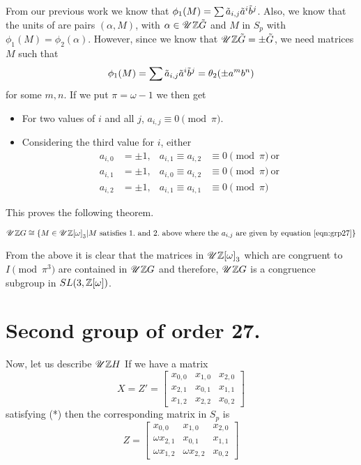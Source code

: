 \documentclass[11pt]{report}
\begin{document}
From our previous work we know that 
$\phi_1(M) = \sum \tilde{a}_{i,j} \tilde{a}^i \tilde{b}^j$.
Also, we know that the units
of \intG{} are pairs $(\alpha,M)$, with 
$\alpha \in \mathscr{U}{ \mathbb{Z}\tilde{G}}$ and $M$ in $S_p$ 
with $\phi_1(M) = \phi_2(\alpha)$.
However, since we know that $\mathscr{U}{ \mathbb{Z}\tilde{G}}  = \pm \tilde{G}$, 
we need matrices $M$ such that
\begin{equation*}
\phi_1(M) = \sum \tilde{a}_{i,j} \tilde{a}^i \tilde{b}^j = \theta_2(\pm a^m b^n)
\end{equation*}
for some $m,n$. If we put $\pi = \omega -1$ we then  get
\begin{itemize}
\item{}For two values of $i$ and all $j$, $a_{i,j} \equiv 0 \pmod{\pi}$.
\item{}Considering the third value for $i$, either 
\begin{align*}
a_{i,0} &= \pm 1, & a_{i,1}\equiv a_{i,2} & \equiv 0 \pmod{\pi} \mathrm{\ or}\\
a_{i,1} &= \pm 1, & a_{i,0}\equiv a_{i,2} & \equiv 0 \pmod{\pi} \mathrm{\ or}\\
a_{i,2} &= \pm 1, & a_{i,1}\equiv a_{i,1} & \equiv 0 \pmod{\pi}
\end{align*}
\end{itemize}
        This proves the following theorem.
\begin{theorem}
\begin{equation*}
\mathscr{U}{ \mathbb{Z}G} \cong \left\{
M\in\mathscr{U}{ \mathbb{Z}[\omega]}_3 |
M \mathrm{\ satisfies\ 1.\ and\ 2.\ above\ where\ the\ }a_{i,j}
\mathrm{\ are\ given\ by\ equation\ }\ref{eqn:grp27}
\right\}
\end{equation*}
\end{theorem}
        
From the above it is clear that the matrices in $\mathscr{U}{ \mathbb{Z}[\omega]}_3 $
 which are congruent to $I \pmod{\pi^3}$ are contained in $\mathscr{U}{ \mathbb{Z}G}$
 and therefore, $\mathscr{U}{ \mathbb{Z}G}$ is a 
congruence subgroup in $SL(3, \mathbb{Z}[\omega])$.

\section{Second group of order 27.}
        Now, let us describe $\mathscr{U}{ \mathbb{Z}H}$ If we have a matrix
\begin{equation*}
X = Z' = \begin{bmatrix}
x_{0,0}&x_{1,0}&x_{2,0}\\
x_{2,1}&x_{0,1}&x_{1,1}\\
x_{1,2}&x_{2,2}&x_{0,2}
\end{bmatrix}
\end{equation*}
satisfying (*) then the corresponding matrix in $S_p$ is
\begin{equation*}
Z = \begin{bmatrix}
x_{0,0}&x_{1,0}&x_{2,0}\\
\omega x_{2,1}&x_{0,1}&x_{1,1}\\
\omega x_{1,2}&\omega x_{2,2}&x_{0,2}
\end{bmatrix}
\end{equation*}
\end{document}

